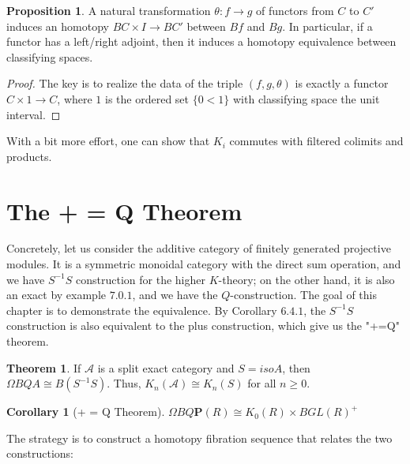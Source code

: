 \documentclass{article}
\theoremstyle{definition}
\newtheorem{theorem}{Theorem}[section]
\theoremstyle{definition}
\theoremstyle{definition}
\theoremstyle{definition}
\newtheorem{proposition}{Proposition}[theorem]
\theoremstyle{definition}
\theoremstyle{definition}
\newtheorem{corollary}{Corollary}[theorem]
\theoremstyle{definition}
\begin{document}
\begin{tcolorbox}[colback=blue!5!white,colframe=blue!30!white]
\begin{proposition}
A natural transformation $\theta: f\to g$ of functors from $C$ to $C'$ induces an homotopy $BC\times I\to BC'$ between $Bf$ and $Bg$. In particular, if a functor has a left/right adjoint, then it induces a homotopy equivalence between classifying spaces. 
\end{proposition}
\end{tcolorbox}
\begin{proof}
    The key is to realize the data of the triple $(f,g,\theta)$ is exactly a functor $C\times 1\to C$, where $1$ is the ordered set $\{0<1\}$ with classifying space the unit interval.
\end{proof}

With a bit more effort, one can show that $K_i$ commutes with filtered colimits and products. 

\section{The + = Q Theorem}
Concretely, let us consider the additive category of finitely generated projective modules. It is a symmetric monoidal category with the direct sum operation, and we have $S^{-1}S$ construction for the higher $K$-theory; on the other hand, it is also an exact by example $7.0.1$, and we have the $Q$-construction. The goal of this chapter is to demonstrate the equivalence. By Corollary $6.4.1$, the $S^{-1}S$ construction is also equivalent to the plus construction, which give us the "+=Q" theorem.

\begin{tcolorbox}[colback=red!5!white,colframe=red!30!white]
\begin{theorem}
If $\mathcal{A}$ is a split exact category and $S=iso A$, then $\Omega BQA\cong B(S^{-1}S)$. Thus, $K_n(\mathcal{A})\cong K_n(S)$ for all $n\geq 0$. 
\end{theorem}
\end{tcolorbox}


\begin{tcolorbox}[colback=green!5!white,colframe=green!30!white]
\begin{corollary}[+ = Q Theorem]
$\Omega BQ \textbf{P}(R)\cong K_0(R)\times BGL(R)^+$
\end{corollary}
\end{tcolorbox}

The strategy is to construct a homotopy fibration sequence that relates the two constructions: 
\end{document}
